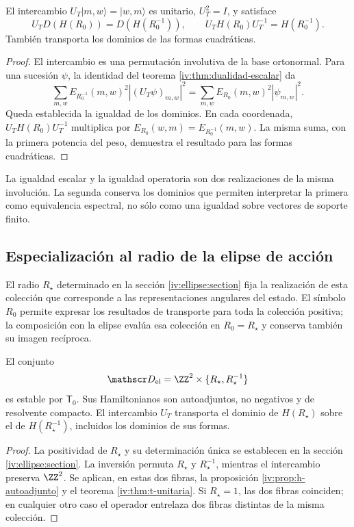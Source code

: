 \begin{theorem}
\label{iv:thm:t-unitaria}
\label{prop:dualidad-radios-k}
El intercambio
\(U_T|m,w\rangle=|w,m\rangle\) es unitario,
\(U_T^2=I\), y satisface
\begin{equation}
 U_TD(H(R_0))=D(H(R_0^{-1})),
 \qquad U_TH(R_0)U_T^{-1}=H(R_0^{-1}).
 \label{iv:eq:conjugacion-h}
\end{equation}
También transporta los dominios de las formas cuadráticas.
\end{theorem}
\begin{proof}
El intercambio es una permutación involutiva de la base
ortonormal. Para una sucesión \(\psi\), la identidad del
teorema \ref{iv:thm:dualidad-escalar} da
\[
 \sum_{m,w}E_{R_0^{-1}}(m,w)^2|(U_T\psi)_{m,w}|^2
 =\sum_{m,w}E_{R_0}(m,w)^2|\psi_{m,w}|^2.
\]
Queda establecida la igualdad de los dominios. En cada coordenada,
\(U_TH(R_0)U_T^{-1}\) multiplica por
\(E_{R_0}(w,m)=E_{R_0^{-1}}(m,w)\). La misma suma, con
la primera potencia del peso, demuestra el resultado para las
formas cuadráticas.
\end{proof}

La igualdad escalar y la igualdad operatoria son dos realizaciones
de la misma involución. La segunda conserva los dominios que
permiten interpretar la primera como equivalencia espectral,
no sólo como una igualdad sobre vectores de soporte finito.

\subsection{Especialización al radio de la elipse de acción}

El radio \(R_\star\) determinado en la sección
\ref{iv:ellipse:section} fija la realización de esta colección que
corresponde a las representaciones angulares del estado. El símbolo
\(R_0\) permite expresar los resultados de transporte para toda la
colección positiva; la composición con la elipse evalúa esa colección en
\(R_0=R_\star\) y conserva también su imagen recíproca.

\begin{corollary}
\label{iv:cor:radio-especializado}
El conjunto
\[
 \mathscr D_{\mathrm{el}}
 =\ZZ^2\times\{R_\star,R_\star^{-1}\}
\]
es estable por \(\mathsf T_0\). Sus Hamiltonianos son autoadjuntos,
no negativos y de resolvente compacto. El intercambio \(U_T\)
transporta el dominio de \(H(R_\star)\) sobre el de
\(H(R_\star^{-1})\), incluidos los dominios de sus formas.
\end{corollary}
\begin{proof}
La positividad de \(R_\star\) y su determinación única se establecen
en la sección \ref{iv:ellipse:section}. La inversión permuta
\(R_\star\) y \(R_\star^{-1}\), mientras el intercambio preserva
\(\ZZ^2\). Se aplican, en estas dos fibras, la proposición
\ref{iv:prop:h-autoadjunto} y el teorema \ref{iv:thm:t-unitaria}.
Si \(R_\star=1\), las dos fibras coinciden; en cualquier otro caso
el operador entrelaza dos fibras distintas de la misma colección.
\end{proof}

